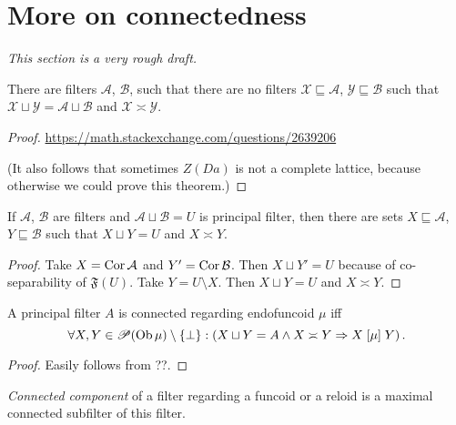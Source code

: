 \chapter{More on connectedness}

\emph{This section is a very rough draft.}

\begin{prop}
  There are filters $\mathcal{A}$, $\mathcal{B}$, such that there are no
  filters $\mathcal{X} \sqsubseteq \mathcal{A}$, $\mathcal{Y} \sqsubseteq
  \mathcal{B}$ such that $\mathcal{X} \sqcup \mathcal{Y} = \mathcal{A} \sqcup
  \mathcal{B}$ and $\mathcal{X} \asymp \mathcal{Y}$.
\end{prop}

\begin{proof}
  \url{https://math.stackexchange.com/questions/2639206}

  (It also follows that sometimes $Z (D a)$ is not a complete lattice, because
  otherwise we could prove this theorem.)
\end{proof}

\begin{prop}
  If $\mathcal{A}$, $\mathcal{B}$ are filters and $\mathcal{A} \sqcup
  \mathcal{B} = U$ is principal filter, then there are sets $X \sqsubseteq
  \mathcal{A}$, $Y \sqsubseteq \mathcal{B}$ such that $X \sqcup Y = U$ and $X
  \asymp Y$.
\end{prop}

\begin{proof}
  Take $X = \operatorname{Cor} \mathcal{A}$ and $Y' = \operatorname{Cor} \mathcal{B}$. Then $X
  \sqcup Y' = U$ because of co-separability of $\mathfrak{F} (U)$. Take $Y = U
  \setminus X$. Then $X \sqcup Y = U$ and $X \asymp Y$.
\end{proof}

\begin{prop}
  A principal filter $A$ is connected regarding endofuncoid $\mu$ iff
  \[ \forall X, Y \in \mathscr{P} (\operatorname{Ob} \mu) \setminus \{ \bot \} :
     \left( X \sqcup Y = A \wedge X \asymp Y \Rightarrow X \mathrel{[\mu]} Y
     \right) . \]
\end{prop}

\begin{proof}
  Easily follows from ??.
\end{proof}

\begin{defn}
  \emph{Connected component} of a filter regarding a funcoid or a reloid
  is a maximal
  connected subfilter of this filter.
\end{defn}


